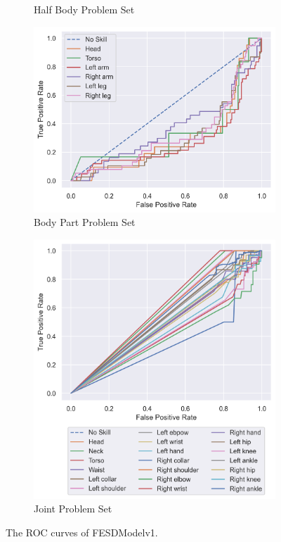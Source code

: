 \begin{figure}[htbp]
\begin{subfigure}[b]{0.4\linewidth}
      \caption[]{Half Body Problem Set}
      \label{fig:hb_roc_v1}
  \end{subfigure}
  \hfill
  \begin{subfigure}[b]{0.4\linewidth}
      \centering
      \includegraphics[width=\textwidth]{figures/Results/v1/roc/bp.png}
      \caption[]{Body Part Problem Set}
      \label{fig:bp_roc_v1}
  \end{subfigure}
  \hfill
  \begin{subfigure}[b]{0.4\linewidth}
      \centering
      \includegraphics[width=\textwidth]{figures/Results/v1/roc/jt.png}
      \caption[]{Joint Problem Set}
      \label{fig:jt_roc_v1}
  \end{subfigure}
  \caption[ROC Curves of FESDModelv1]{The ROC curves of FESDModelv1.}
  \label{fig:roc_v1}
\end{figure}

